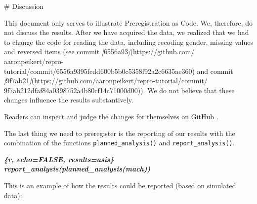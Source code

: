 \documentclass[psych,tutorial,accept,moreauthors,pdftex]{Definitions/mdpi}
\newenvironment{Shaded}{\begin{snugshade}}{\end{snugshade}}
\newcommand{\CommentTok}[1]{\textcolor[rgb]{0.56,0.35,0.01}{\textit{#1}}}
\newcommand{\FunctionTok}[1]{\textcolor[rgb]{0.00,0.00,0.00}{#1}}
\newcommand{\InformationTok}[1]{\textcolor[rgb]{0.56,0.35,0.01}{\textbf{\textit{#1}}}}
\newcommand{\NormalTok}[1]{#1}
\newcommand{\OtherTok}[1]{\textcolor[rgb]{0.56,0.35,0.01}{#1}}
\begin{document}
\nointerlineskip
\begin{adjustwidth}{0.5cm}{0cm} 
\begin{Shaded}
\begin{Highlighting}[]
\FunctionTok{\# Discussion}

\NormalTok{This document only serves to illustrate Preregistration as Code. We, therefore,}
\NormalTok{do not discuss the results. After we have acquired the data, we realized that}
\NormalTok{we had to change the code for reading the data, including recoding gender,}
\NormalTok{missing values and reversed items (see commit }\CommentTok{[}\OtherTok{6556a93}\CommentTok{]}\NormalTok{(https://github.com/}
\NormalTok{aaronpeikert/repro{-}tutorial/commit/6556a9395fcdd600b5b0c5358f92a2c6635ae360)}
\NormalTok{and commit }\CommentTok{[}\OtherTok{9f7ab21}\CommentTok{]}\NormalTok{(https://github.com/aaronpeikert/repro{-}tutorial/commit/}
\NormalTok{9f7ab212dfaf84a0398752a4b80cf14c71000d00)). We do not believe that these changes}
\NormalTok{influence the results substantively.}
\end{Highlighting}
\end{Shaded}
\end{adjustwidth}
\begin{paracol}{2}
\switchcolumn


Readers can inspect and judge the changes for themselves on {GitHub}
.

The last thing we need to preregister is the reporting of our results
with the combination of the functions \texttt{planned\_analysis()} and
\texttt{report\_analysis()}.

\begin{adjustwidth}{0.5cm}{0cm} 
\begin{Shaded}
\begin{Highlighting}[]
\InformationTok{\textasciigrave{}\textasciigrave{}\textasciigrave{}\{r, echo=FALSE, results=\textquotesingle{}asis\textquotesingle{}\}}
\InformationTok{report\_analysis(planned\_analysis(mach))}
\InformationTok{\textasciigrave{}\textasciigrave{}\textasciigrave{}}
\end{Highlighting}
\end{Shaded}
\end{adjustwidth}

This is an example of how the results could be reported (based on
simulated data):

\vspace{+6pt}
\end{paracol}
\end{document}
